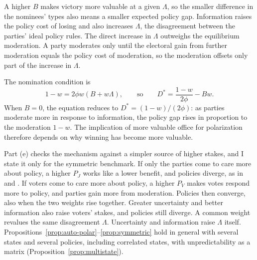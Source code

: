 \documentclass[12pt,letterpaper]{article}
\begin{document}
A higher $B$ makes victory more valuable at a given $\Lambda$, so the smaller difference in the nominees' types also means a smaller expected policy gap. Information raises the policy cost of losing and also increases $\Lambda$, the disagreement between the parties' ideal policy rules. The direct increase in $\Lambda$ outweighs the equilibrium moderation. A party moderates only until the electoral gain from further moderation equals the policy cost of moderation, so the moderation offsets only part of the increase in $\Lambda$.

The nomination condition is
\[
1-w=2\phi w(B+w\Lambda),
\qquad\text{so}\qquad
D^*=\frac{1-w}{2\phi}-Bw.
\]
When $B=0$, the equation reduces to $D^*=(1-w)/(2\phi)$: as parties moderate more in response to information, the policy gap rises in proportion to the moderation $1-w$. The implication of more valuable office for polarization therefore depends on why winning has become more valuable.

Part (e) checks the mechanism against a simpler source of higher stakes, and I state it only for the symmetric benchmark. If only the parties come to care more about policy, a higher $P_J$ works like a lower benefit, and policies diverge, as in \citet{Wittman1983} and \citet{Calvert1985}. If voters come to care more about policy, a higher $P_V$ makes votes respond more to policy, and parties gain more from moderation. Policies then converge, also when the two weights rise together. Greater uncertainty and better information also raise voters' stakes, and policies still diverge. A common weight revalues the same disagreement $\Lambda$. Uncertainty and information raise $\Lambda$ itself. Propositions~\ref{prop:auto-polar}--\ref{prop:symmetric} hold in general with several states and several policies, including correlated states, with unpredictability as a matrix (Proposition~\ref{prop:multistate}).
\end{document}
